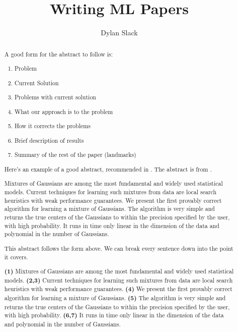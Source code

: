 \documentclass[11pt]{article}
\begin{document}
\title{Writing ML Papers}

\author{Dylan Slack}

\begin{titlepage}
\maketitle

\thispagestyle{empty}

\begin{abstract}

\noindent
A good form for the abstract to follow is:
\begin{enumerate}
    \item Problem
    \item Current Solution
    \item Problems with current solution
    \item What our approach is to the problem
    \item How it corrects the problems
    \item Brief description of results
    \item Summary of the rest of the paper (landmarks)
\end{enumerate}

\noindent
Here's an example of a good abstract, recommended in \parencite{liptonwriting}.  The abstract is from \parencite{sanjoymixgauss}. 

\begin{displayquote}
Mixtures of Gaussians are among the most fundamental and widely used statistical models. Current techniques for learning such mixtures from data are local search heuristics with weak performance guarantees. We present the first provably correct algorithm for learning a mixture of Gaussians. The algorithm is very simple and returns the true centers of the Gaussians to within the precision specified by the user, with high probability. It runs in time only linear in the dimension of the data and polynomial in the number of Gaussians.
\end{displayquote}

This abstract follows the form above.  We can break every sentence down into the point it covers.

\begin{displayquote}
\textbf{(1)} Mixtures of Gaussians are among the most fundamental and widely used statistical models. \textbf{(2,3)} Current techniques for learning such mixtures from data are local search heuristics with weak performance guarantees. \textbf{(4)} We present the first provably correct algorithm for learning a mixture of Gaussians. \textbf{(5)} The algorithm is very simple and returns the true centers of the Gaussians to within the precision specified by the user, with high probability. \textbf{(6,7)} It runs in time only linear in the dimension of the data and polynomial in the number of Gaussians.
\end{displayquote}




\end{abstract}

\end{titlepage}
\end{document}
